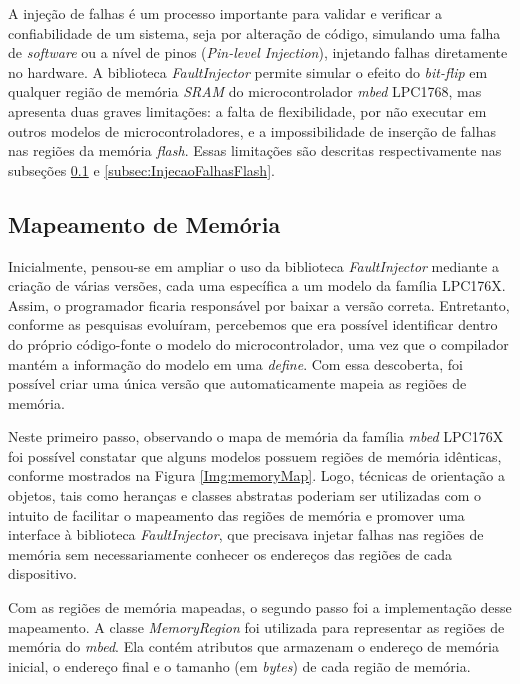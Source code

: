 A injeção de falhas é um processo importante para validar e verificar a confiabilidade de um sistema, seja por alteração de código, simulando uma falha de \textit{software} ou a nível de pinos (\textit{Pin-level Injection}), injetando falhas diretamente no hardware. A biblioteca \textit{FaultInjector} permite simular o efeito do \textit{bit-flip} em qualquer região de memória \textit{SRAM} do microcontrolador \textit{mbed} LPC1768, mas apresenta duas graves limitações: a falta de flexibilidade, por não executar em outros modelos de microcontroladores, e a impossibilidade de inserção de falhas nas regiões da memória \textit{flash}. Essas limitações são descritas respectivamente nas subseções \ref{subsec:MapDeMemoria} e \ref{subsec:InjecaoFalhasFlash}.

\subsection{Mapeamento de Memória} \label{subsec:MapDeMemoria}

Inicialmente, pensou-se em ampliar o uso da biblioteca \textit{FaultInjector} mediante a criação de várias versões, cada uma específica a um modelo da família LPC176X. Assim, o programador ficaria responsável por baixar a versão correta. Entretanto, conforme as pesquisas evoluíram, percebemos que era possível identificar dentro do próprio código-fonte o modelo do microcontrolador, uma vez que o compilador mantém a informação do modelo em uma \textit{define}. Com essa descoberta, foi possível criar uma única versão que automaticamente mapeia as regiões de memória.

Neste primeiro passo, observando o mapa de memória da família \textit{mbed} LPC176X \cite{manualLpc176x:2016} foi possível constatar que alguns modelos possuem regiões de memória idênticas, conforme mostrados na Figura \ref{Img:memoryMap}. Logo, técnicas de orientação a objetos, tais como heranças e classes abstratas poderiam ser utilizadas com o intuito de facilitar o mapeamento das regiões de memória e promover uma interface à biblioteca \textit{FaultInjector}, que precisava injetar falhas nas regiões de memória sem necessariamente conhecer os endereços das regiões de cada dispositivo.

Com as regiões de memória mapeadas, o segundo passo foi a implementação desse mapeamento. A classe \textit{MemoryRegion}\cite{Kruger:2014} foi utilizada para representar as regiões de memória do \textit{mbed}. Ela contém atributos que armazenam o endereço de memória inicial, o endereço final e o tamanho (em \textit{bytes}) de cada região de memória. 

